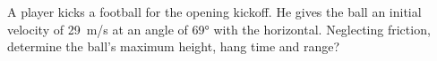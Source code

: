 


\begin{example}
  A player kicks a football for the opening kickoff. He
  gives the ball an initial velocity of \SI{29}{m/s} at an angle of \ang{69}
  with the horizontal. Neglecting friction, determine the ball's maximum height,
  hang time and range?
\end{example}
